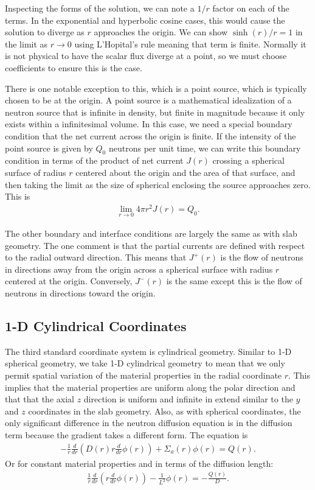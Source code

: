 Inspecting the forms of the solution, we can note a $1/r$ factor on each of the terms. In the exponential and hyperbolic cosine cases, this would cause the solution to diverge as $r$ approaches the origin. We can show $\sinh(r)/r = 1$ in the limit as $r \rightarrow 0$ using L'Hopital's rule meaning that term is finite. Normally it is not physical to have the scalar flux diverge at a point, so we must choose coefficients to ensure this is the case. 

There is one notable exception to this, which is a point source, which is typically chosen to be at the origin. A point source is a mathematical idealization of a neutron source that is infinite in density, but finite in magnitude because it only exists within a infinitesimal volume. In this case, we need a special boundary condition that the net current across the origin is finite. If the intensity of the point source is given by $Q_0$ neutrons per unit time, we can write this boundary condition in terms of the product of net current $J(r)$ crossing a spherical surface of radius $r$ centered about the origin and the area of that surface, and then taking the limit as the size of spherical enclosing the source approaches zero. This is
\begin{align}
  \lim_{r \rightarrow 0} 4 \pi r^2 J(r) = Q_0.
\end{align}

The other boundary and interface conditions are largely the same as with slab geometry. The one comment is that the partial currents are defined with respect to the radial outward direction. This means that $J^+(r)$ is the flow of neutrons in directions away from the origin across a spherical surface with radius $r$ centered at the origin. Conversely, $J^-(r)$ is the same except this is the flow of neutrons in directions toward the origin.

\subsection{1-D Cylindrical Coordinates}

The third standard coordinate system is cylindrical geometry. Similar to 1-D spherical geometry, we take 1-D cylindrical geometry to mean that we only permit spatial variation of the material properties in the radial coordinate $r$. This implies that the material properties are uniform along the polar direction and that that the axial $z$ direction is uniform and infinite in extend similar to the $y$ and $z$ coordinates in the slab geometry. Also, as with spherical coordinates, the only significant difference in the neutron diffusion equation is in the diffusion term because the gradient takes a different form. The equation is
\begin{align}
  - \frac{1}{r} \frac{d}{dr} \left( D(r) r \frac{d}{dr} \phi(r) \right) + \Sigma_a(r) \phi(r) = Q(r).
\end{align}
Or for constant material properties and in terms of the diffusion length:
\begin{align}
  \frac{1}{r} \frac{d}{dr} \left( r \frac{d}{dr} \phi(r) \right) - \frac{1}{L^2} \phi(r) = -\frac{Q(r)}{D}.
\end{align}

